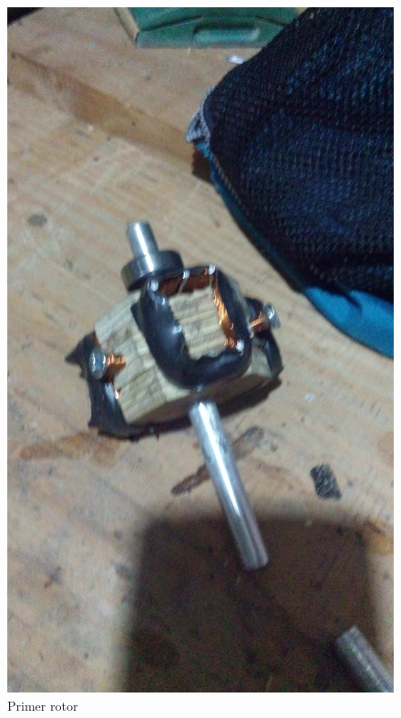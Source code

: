 \begin{figure}[!htbp]
\caption{Primer rotor}
\centering
\includegraphics [scale=0.10]
{./img/20160228_190829.jpg}
\end{figure}

